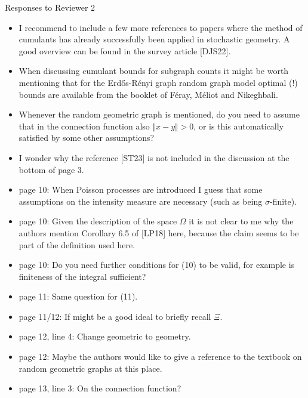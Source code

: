 \documentclass[11pt]{article}
\let\Horig\H
\def\H{{\mathord{\mathbb H}}}
\begin{document}
\newpage

\begin{center} 
\large{Responses to Reviewer 2} %
\\ 
\end{center}

\noindent 


\begin{itemize}
  \item 
 I recommend to include a few more references to papers where the method of cumulants has already successfully been applied in stochastic geometry. A good overview can be found in the survey article [DJS22].
\item  When discussing cumulant bounds for subgraph counts it might be worth mentioning that for the
 Erd{\Horig o}s-R\'enyi graph 
 random graph model optimal (!) bounds are available from the booklet of Féray, Méliot and Nikeghbali.
\item  Whenever the random geometric graph is mentioned, do you need to assume that in the connection function also
  $\Vert x - y \Vert> 0$,
  or is this automatically satisfied by some other assumptions?
      \item I wonder why the reference [ST23] is not included in the discussion at the bottom of page 3.
  \item  page 10: When Poisson processes are introduced I guess that some assumptions on the intensity measure are necessary (such as being $\sigma$-finite).
  \item  page 10: Given the description of the space $\Omega$ it is not clear to me why the authors mention Corollary 6.5 of [LP18] here, because the claim seems to be part of the definition used here.
  \item  page 10: Do you need further conditions for (10) to be valid, for example is finiteness of the integral sufficient?
  \item  page 11: Same question for (11).
  \item  page 11/12: If might be a good ideal to briefly recall $\Xi$.
  \item  page 12, line 4: Change geometric to geometry.
  \item  page 12: Maybe the authors would like to give a reference to the textbook on random geometric graphs at this place.
  \item  page 13, line 3: On the connection function?

\end{itemize}
\end{document}
